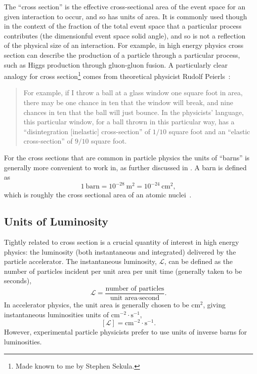 The ``cross section'' is the effective cross-sectional area of the event space for an given interaction to occur, and so has units of area.
It is commonly used though in the context of the fraction of the total event space that a particular process contributes (the dimensionful event space solid angle), and so is not a reflection of the physical size of an interaction.
For example, in high energy physics cross section can describe the production of a particle through a particular process, such as Higgs production through gluon-gluon fusion.
A particularly clear analogy for cross section\footnote{Made known to me by Stephen Sekula.} comes from theoretical physicist Rudolf Peierls~\cite{rhodes2012making}:
\begin{quote}
 For example, if I throw a ball at a glass window one square foot in area, there may be one chance in ten that the window will break, and nine chances in ten that the ball will just bounce.
 In the physicists' language, this particular window, for a ball thrown in this particular way, has a ``disintegration [inelastic] cross-section'' of $1/10$ square foot and an ``elastic cross-section'' of $9/10$ square foot.
\end{quote}
For the cross sections that are common in particle physics the units of ``barns'' is generally more convenient to work in, as further discussed in .
A barn is defined as
\begin{equation}
 1~\textrm{barn} = 10^{-28}~\textrm{m}^2 = 10^{-24}~\textrm{cm}^2,
 \label{eq:barn_to_area}
\end{equation}
which is roughly the cross sectional area of an atomic nuclei~\cite{web:history_physics_purdue,history:etymology_barn}.

\subsection{Units of Luminosity}\label{subsection:luminosity_units}
Tightly related to cross section is a crucial quantity of interest in high energy physics: the luminosity (both instantaneous and integrated) delivered by the particle accelerator.
The instantaneous luminosity, $\mathscr{L}$, can be defined as the number of particles incident per unit area per unit time (generally taken to be seconds),
\begin{equation}
 \mathscr{L} = \frac{\text{number of particles}}{\text{unit area} \cdot \text{second}}.
 \label{eq:instantaneous_luminosity}
\end{equation}
In accelerator physics, the unit area is generally chosen to be $\textrm{cm}^2$, giving instantaneous luminosities units of $\textrm{cm}^{-2} \cdot \textrm{s}^{-1}$,
\[
 \left[\mathscr{L}\right] = \textrm{cm}^{-2} \cdot \textrm{s}^{-1}.
\]
However, experimental particle physicists prefer to use units of inverse barns for luminosities.

